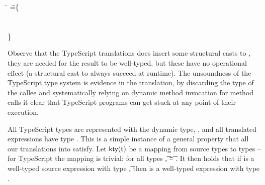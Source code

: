 \documentclass[acmsmall, anonymous, authordraft, review]{acmart} %
\begin{document}
\medskip
{\small
\begin{tabbing}
  \hspace{.2cm}
   \= \DynCall{(\SubCast\any{\New\C{}})}\m{\DynCall{(\SubCast\any{\New\C{}})}\n{\New\C{}}} \HS\HS\HS\WHERE\HS \K\HS =\HS\= \class\= \C \{\\
   \>              \>\HS \Mdef\m\x\any\any{~\SubCast\any\this~} \\
   \>              \>\HS  \Mdef\mp\x\any\any{~\x~}\\
   \>                                                              \>  \}   
\end{tabbing}}
\medskip

\noindent
Observe that the TypeScript translations does insert some structural casts
to \any, they are needed for the result to be well-typed, but these have no
operational effect (a structural cast to \any always succeed at runtime).
The unsoundness of the TypeScript type system is evidence in the
translation, by discarding the type of the callee and systematically relying
on dynamic method invocation for method calls it clear that TypeScript
programs can get stuck at any point of their execution.


All TypeScript types are represented with the dynamic \kafka type, \any, and
all translated expressions have type \any.  This is a simple instance of a
general property that all our translations into \kafka satisfy.  Let
\(\kty\t\) be a mapping from source types to \kafka types -- for TypeScript
the mapping is trivial: for all types \t, \kty\t = \src{\any}.  It then
holds that if \e is a well-typed source expression with type \t, then
\TR{\e} is a well-typed \kafka expression with type \kty{\t}. 


\end{document}
